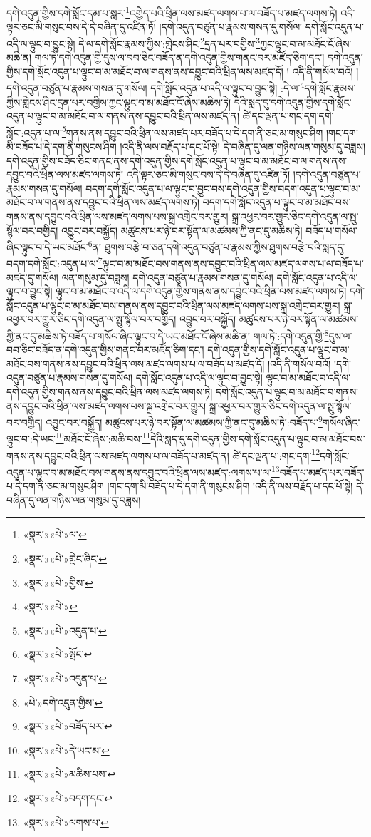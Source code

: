 དགེ་འདུན་གྱིས་དགེ་སློང་དམ་པ་སླར་\footnote{«སྣར་»«པེ་»ལ་}འགྱེད་པའི་ཕྲིན་ལས་མཛད་ལགས་པ་ལ་བཟོད་པ་མཛད་ལགས་ཏེ། འདི་ལྟར་ཅང་མི་གསུང་བས་དེ་དེ་བཞིན་དུ་འཛིན་ཏོ། །དགེ་འདུན་བཙུན་པ་རྣམས་གསན་དུ་གསོལ། དགེ་སློང་འདུན་པ་འདི་ལ་ལྟུང་བ་བྱུང་སྟེ། དེ་ལ་དགེ་སློང་རྣམས་ཀྱིས་:གླེངས་ཤིང་\footnote{«སྣར་»«པེ་»གླེང་ཞིང་}དྲན་པར་བགྱིས་\footnote{«སྣར་»«པེ་»གྱིས་}ཀྱང་ལྟུང་བ་མ་མཐོང་ངོ་ཞེས་མཆི་ན། གལ་ཏེ་དགེ་འདུན་གྱི་དུས་ལ་བབ་ཅིང་བཟོད་ན་དགེ་འདུན་གྱིས་གནང་བར་མཛོད་ཅིག་དང་། དགེ་འདུན་གྱིས་དགེ་སློང་འདུན་པ་ལྟུང་བ་མ་མཐོང་བ་ལ་གནས་ནས་དབྱུང་བའི་ཕྲིན་ལས་མཛད་དོ། །
འདི་ནི་གསོལ་བའོ། །དགེ་འདུན་བཙུན་པ་རྣམས་གསན་དུ་གསོལ། དགེ་སློང་འདུན་པ་འདི་ལ་ལྟུང་བ་བྱུང་སྟེ། :དེ་ལ་\footnote{«སྣར་»«པེ་»}དགེ་སློང་རྣམས་ཀྱིས་གླེངས་ཤིང་དྲན་པར་བགྱིས་ཀྱང་ལྟུང་བ་མ་མཐོང་ངོ་ཞེས་མཆིས་ཏེ། དེའི་སླད་དུ་དགེ་འདུན་གྱིས་དགེ་སློང་འདུན་པ་ལྟུང་བ་མ་མཐོང་བ་ལ་གནས་ནས་དབྱུང་བའི་ཕྲིན་ལས་མཛད་ན། ཚེ་དང་ལྡན་པ་གང་དག་དགེ་སློང་:འདུན་པ་ལ་\footnote{«སྣར་»«པེ་»འདུན་པ་}གནས་ནས་དབྱུང་བའི་ཕྲིན་ལས་མཛད་པར་བཟོད་པ་དེ་དག་ནི་ཅང་མ་གསུང་ཤིག །གང་དག་མི་བཟོད་པ་དེ་དག་ནི་གསུངས་ཤིག །འདི་ནི་ལས་བརྗོད་པ་དང་པོ་སྟེ། དེ་བཞིན་དུ་ལན་གཉིས་ལན་གསུམ་དུ་བཟླས། དགེ་འདུན་གྱིས་བཟོད་ཅིང་གནང་ནས་དགེ་འདུན་གྱིས་དགེ་སློང་འདུན་པ་ལྟུང་བ་མ་མཐོང་བ་ལ་གནས་ནས་དབྱུང་བའི་ཕྲིན་ལས་མཛད་ལགས་ཏེ། འདི་ལྟར་ཅང་མི་གསུང་བས་དེ་དེ་བཞིན་དུ་འཛིན་ཏོ། །དགེ་འདུན་བཙུན་པ་རྣམས་གསན་དུ་གསོལ། བདག་དགེ་སློང་འདུན་པ་ལ་ལྟུང་བ་བྱུང་བས་དགེ་འདུན་གྱིས་བདག་འདུན་པ་ལྟུང་བ་མ་མཐོང་བ་ལ་གནས་ནས་དབྱུང་བའི་ཕྲིན་ལས་མཛད་ལགས་ཏེ། བདག་དགེ་སློང་འདུན་པ་ལྟུང་བ་མ་མཐོང་བས་གནས་ནས་དབྱུང་བའི་ཕྲིན་ལས་མཛད་ལགས་པས་སྐྲ་འགྲེང་བར་གྱུར། སྐྲ་འཕྱར་བར་གྱུར་ཅིང་དགེ་འདུན་ལ་སྤུ་སྙོལ་བར་བགྱིད། འབྱུང་བར་བསྐྱོད། མཚུངས་པར་ཉེ་བར་སྟོན་ལ་མཚམས་ཀྱི་ནང་དུ་མཆིས་ཏེ། བཟོད་པ་གསོལ་ཞིང་ལྟུང་བ་དེ་ཡང་མཐོང་\footnote{«སྣར་»«པེ་»སྤོང་}ན། ཐུགས་བརྩེ་བ་ཅན་དགེ་འདུན་བཙུན་པ་རྣམས་ཀྱིས་ཐུགས་བརྩེ་བའི་སླད་དུ་བདག་དགེ་སློང་:འདུན་པ་ལ་\footnote{«སྣར་»«པེ་»འདུན་པ་}ལྟུང་བ་མ་མཐོང་བས་གནས་ནས་དབྱུང་བའི་ཕྲིན་ལས་མཛད་ལགས་པ་ལ་བཟོད་པ་མཛད་དུ་གསོལ། ལན་གསུམ་དུ་བཟླས། དགེ་འདུན་བཙུན་པ་རྣམས་གསན་དུ་གསོལ། དགེ་སློང་འདུན་པ་འདི་ལ་ལྟུང་བ་བྱུང་སྟེ། ལྟུང་བ་མ་མཐོང་བ་འདི་ལ་དགེ་འདུན་གྱིས་གནས་ནས་དབྱུང་བའི་ཕྲིན་ལས་མཛད་ལགས་ཏེ། དགེ་སློང་འདུན་པ་ལྟུང་བ་མ་མཐོང་བས་གནས་ནས་དབྱུང་བའི་ཕྲིན་ལས་མཛད་ལགས་པས་སྐྲ་འགྲེང་བར་གྱུར། སྐྲ་འཕྱར་བར་གྱུར་ཅིང་དགེ་འདུན་ལ་སྤུ་སྙོལ་བར་བགྱིད། འབྱུང་བར་བསྐྱོད། མཚུངས་པར་ཉེ་བར་སྟོན་ལ་མཚམས་ཀྱི་ནང་དུ་མཆིས་ཏེ་བཟོད་པ་གསོལ་ཞིང་ལྟུང་བ་དེ་ཡང་མཐོང་ངོ་ཞེས་མཆི་ན། གལ་ཏེ་:དགེ་འདུན་གྱི་\footnote{«པེ་»དགེ་འདུན་གྱིས་}དུས་ལ་བབ་ཅིང་བཟོད་ན་དགེ་འདུན་གྱིས་གནང་བར་མཛོད་ཅིག་དང་། དགེ་འདུན་གྱིས་དགེ་སློང་འདུན་པ་ལྟུང་བ་མ་མཐོང་བས་གནས་ནས་དབྱུང་བའི་ཕྲིན་ལས་མཛད་ལགས་པ་ལ་བཟོད་པ་མཛད་དོ། །འདི་ནི་གསོལ་བའོ། །དགེ་འདུན་བཙུན་པ་རྣམས་གསན་དུ་གསོལ། དགེ་སློང་འདུན་པ་འདི་ལ་ལྟུང་བ་བྱུང་སྟེ། ལྟུང་བ་མ་མཐོང་བ་འདི་ལ་དགེ་འདུན་གྱིས་གནས་ནས་དབྱུང་བའི་ཕྲིན་ལས་མཛད་ལགས་ཏེ། དགེ་སློང་འདུན་པ་ལྟུང་བ་མ་མཐོང་བ་གནས་ནས་དབྱུང་བའི་ཕྲིན་ལས་མཛད་ལགས་པས་སྐྲ་འགྲེང་བར་གྱུར། སྐྲ་འཕྱར་བར་གྱུར་ཅིང་དགེ་འདུན་ལ་སྤུ་སྙོལ་བར་བགྱིད། འབྱུང་བར་བསྐྱོད། མཚུངས་པར་ཉེ་བར་སྟོན་ལ་མཚམས་ཀྱི་ནང་དུ་མཆིས་ཏེ་:བཟོད་པ་\footnote{«སྣར་»«པེ་»བཟོད་པར་}གསོལ་ཞིང་ལྟུང་བ་:དེ་ཡང་\footnote{«སྣར་»«པེ་»དེ་ཡང་མ་}མཐོང་ངོ་ཞེས་:མཆི་བས་\footnote{«སྣར་»«པེ་»མཆིས་པས་}དེའི་སླད་དུ་དགེ་འདུན་གྱིས་དགེ་སློང་འདུན་པ་ལྟུང་བ་མ་མཐོང་བས་གནས་ནས་དབྱུང་བའི་ཕྲིན་ལས་མཛད་ལགས་པ་ལ་བཟོད་པ་མཛད་ན། ཚེ་དང་ལྡན་པ་:གང་དག་\footnote{«སྣར་»«པེ་»བདག་དང་}དགེ་སློང་འདུན་པ་ལྟུང་བ་མ་མཐོང་བས་གནས་ནས་དབྱུང་བའི་ཕྲིན་ལས་མཛད་:ལགས་པ་ལ་\footnote{«སྣར་»«པེ་»ལགས་པ་}བཟོད་པ་མཛད་པར་བཟོད་པ་དེ་དག་ནི་ཅང་མ་གསུང་ཤིག །གང་དག་མི་བཟོད་པ་དེ་དག་ནི་གསུངས་ཤིག །འདི་ནི་ལས་བརྗོད་པ་དང་པོ་སྟེ། དེ་བཞིན་དུ་ལན་གཉིས་ལན་གསུམ་དུ་བཟླས། 